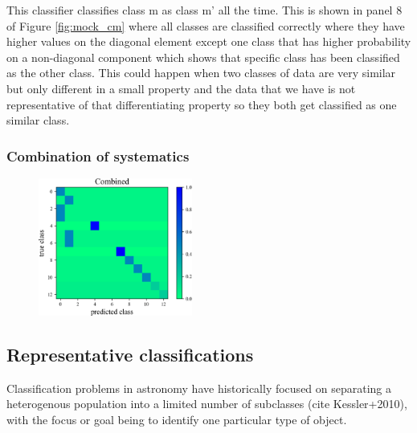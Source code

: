 This classifier classifies class m as class m' all the time.
This is shown in panel 8 of Figure \ref{fig:mock_cm}  where all classes are classified correctly where they have higher values on the diagonal element except one class that has higher probability on a non-diagonal component which shows that specific class has been classified as the other class.
This could happen when two classes of data are very similar but only different in a small property and the data that we have is not representative of that differentiating property so they both get classified as one similar class. 

\subsubsection{Combination of systematics}
\label{sec:combo}

\begin{figure}
	\begin{center}
		\includegraphics[width=0.45\textwidth]{./fig/Combined.png}
		\caption{}
		\label{fig:combo_cm}
	\end{center}
\end{figure}

\subsection{Representative classifications}
\label{sec:realdata}



Classification problems in astronomy have historically focused on separating a heterogenous population into a limited number of subclasses (cite Kessler+2010), with the focus or goal being to identify one particular type of object.


